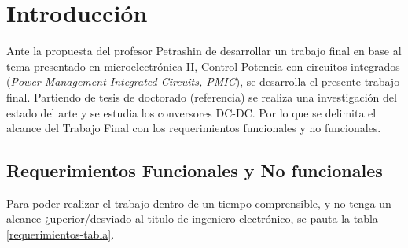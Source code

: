 \chapter{Introducción}
\label{Introducción}

Ante la propuesta del profesor Petrashin de desarrollar un trabajo final en base al tema presentado en microelectrónica II, Control Potencia con circuitos integrados (\textit{Power Management Integrated Circuits, PMIC}), se desarrolla el presente trabajo final. Partiendo de tesis de doctorado (referencia) se realiza una investigación del estado del arte y se estudia los conversores DC-DC. Por lo que se delimita el alcance del Trabajo Final con los requerimientos funcionales y no funcionales.
\section{Requerimientos Funcionales y No funcionales}
Para poder realizar el trabajo dentro de un tiempo comprensible, y no tenga un alcance ¿uperior/desviado al titulo de ingeniero electrónico, se pauta la tabla \ref{requerimientos-tabla}.
\begin{table}[h]
\caption{Requerimientos funcionales y no funcionales}
\label{requerimientos-tabla}
\end{table}

